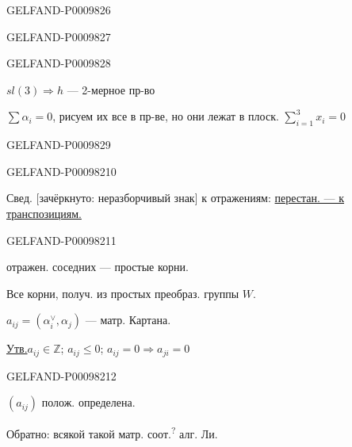 \begin{GelfandAdjacentEvidence}{GELFAND-P000982}{6}

\end{GelfandAdjacentEvidence}
\begin{GelfandAdjacentEvidence}{GELFAND-P000982}{7}

\end{GelfandAdjacentEvidence}
\begin{GelfandAdjacentEvidence}{GELFAND-P000982}{8}


$sl(3)\Rightarrow h$ --- 2-мерное пр-во

$\sum\alpha_i=0$, рисуем их все в пр-ве, но они лежат в плоск. $\sum_{i=1}^{3}x_i=0$
\end{GelfandAdjacentEvidence}
\begin{GelfandAdjacentEvidence}{GELFAND-P000982}{9}


\end{GelfandAdjacentEvidence}
\begin{GelfandAdjacentEvidence}{GELFAND-P000982}{10}


Свед. [зачёркнуто: неразборчивый знак] к отражениям: \underline{перестан. --- к транспозициям.}
\end{GelfandAdjacentEvidence}
\begin{GelfandAdjacentEvidence}{GELFAND-P000982}{11}


отражен. соседних --- простые корни.

Все корни, получ. из простых преобраз. группы $W$.

$a_{ij}=(\alpha_i^{\vee},\alpha_j)$ --- матр. Картана.

\underline{Утв.}\quad $a_{ij}\in\mathbb Z$; $a_{ij}\leq0$; $a_{ij}=0\Rightarrow a_{ji}=0$ 
\end{GelfandAdjacentEvidence}
\begin{GelfandAdjacentEvidence}{GELFAND-P000982}{12}


$(a_{ij})$ полож. определена.

Обратно: всякой такой матр. соот.\textsuperscript{?} алг. Ли.
\end{GelfandAdjacentEvidence}



